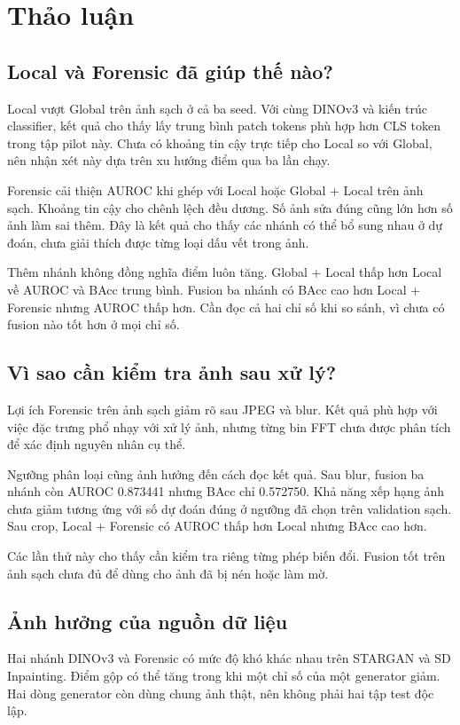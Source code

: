 \section{Thảo luận}
\subsection{Local và Forensic đã giúp thế nào?}
Local vượt Global trên ảnh sạch ở cả ba seed. Với cùng DINOv3 và kiến trúc classifier, kết quả cho thấy lấy trung bình patch tokens phù hợp hơn CLS token trong tập pilot này. Chưa có khoảng tin cậy trực tiếp cho Local so với Global, nên nhận xét này dựa trên xu hướng điểm qua ba lần chạy.

Forensic cải thiện AUROC khi ghép với Local hoặc Global + Local trên ảnh sạch. Khoảng tin cậy cho chênh lệch đều dương. Số ảnh sửa đúng cũng lớn hơn số ảnh làm sai thêm. Đây là kết quả cho thấy các nhánh có thể bổ sung nhau ở dự đoán, chưa giải thích được từng loại dấu vết trong ảnh.

Thêm nhánh không đồng nghĩa điểm luôn tăng. Global + Local thấp hơn Local về AUROC và BAcc trung bình. Fusion ba nhánh có BAcc cao hơn Local + Forensic nhưng AUROC thấp hơn. Cần đọc cả hai chỉ số khi so sánh, vì chưa có fusion nào tốt hơn ở mọi chỉ số.

\subsection{Vì sao cần kiểm tra ảnh sau xử lý?}
Lợi ích Forensic trên ảnh sạch giảm rõ sau JPEG và blur. Kết quả phù hợp với việc đặc trưng phổ nhạy với xử lý ảnh, nhưng từng bin FFT chưa được phân tích để xác định nguyên nhân cụ thể.

Ngưỡng phân loại cũng ảnh hưởng đến cách đọc kết quả. Sau blur, fusion ba nhánh còn AUROC 0.873441 nhưng BAcc chỉ 0.572750. Khả năng xếp hạng ảnh chưa giảm tương ứng với số dự đoán đúng ở ngưỡng đã chọn trên validation sạch. Sau crop, Local + Forensic có AUROC thấp hơn Local nhưng BAcc cao hơn.

Các lần thử này cho thấy cần kiểm tra riêng từng phép biến đổi. Fusion tốt trên ảnh sạch chưa đủ để dùng cho ảnh đã bị nén hoặc làm mờ.

\subsection{Ảnh hưởng của nguồn dữ liệu}
Hai nhánh DINOv3 và Forensic có mức độ khó khác nhau trên STARGAN và SD Inpainting. Điểm gộp có thể tăng trong khi một chỉ số của một generator giảm. Hai dòng generator còn dùng chung ảnh thật, nên không phải hai tập test độc lập.

